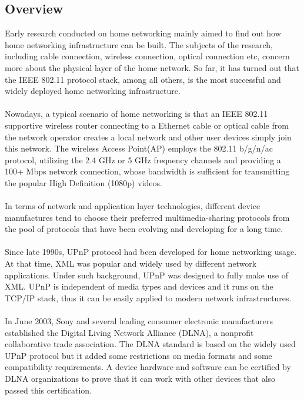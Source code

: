 \subsection{Overview\label{2_1}} 
Early research \cite{link_layer_old} \cite{end_user} \cite{link_layer}
conducted on home networking mainly aimed to find out how home networking
infrastructure can be built. The subjects of the research, including cable
connection, wireless connection, optical connection etc, concern more about
the physical layer of the home network.  So far, it has turned out that the
IEEE 802.11 protocol stack, among all others, is the most successful and 
widely deployed home networking infrastructure.\\
\\
Nowadays, a typical scenario of home networking is that an IEEE 802.11
supportive wireless router connecting to a Ethernet cable or optical cable from
the network operator creates a local network and other user devices simply join
this network. The wireless Access Point(AP) employs the 802.11 b/g/n/ac
protocol, utilizing the 2.4 GHz or 5 GHz frequency channels and providing a
100+ Mbps  network connection, whose bandwidth is sufficient for transmitting
the popular High Definition (1080p) videos.\\
\\
In terms of network and application layer technologies, different device 
manufactures tend to choose their preferred multimedia-sharing protocols from
the pool of protocols that have been evolving and developing for a long time.\\
\\
Since late 1990s, UPnP protocol had been developed for home networking usage. 
At that time, XML was popular and widely used by different network applications.
Under such background, UPnP was designed to fully make use of XML. UPnP is 
independent of media types and devices and it runs on the TCP/IP stack, thus it can 
be easily applied to modern network infrastructures.\\
\\ 
In June 2003, Sony and several leading consumer electronic manufacturers
established the Digital Living Network Alliance (DLNA), a nonprofit 
collaborative trade association. The DLNA standard is based on the widely used UPnP 
protocol but it added some restrictions on media formats and some compatibility 
requirements. A device hardware and software can be certified by DLNA 
organizations to prove that it can work with other devices that also passed 
this certification. \\
